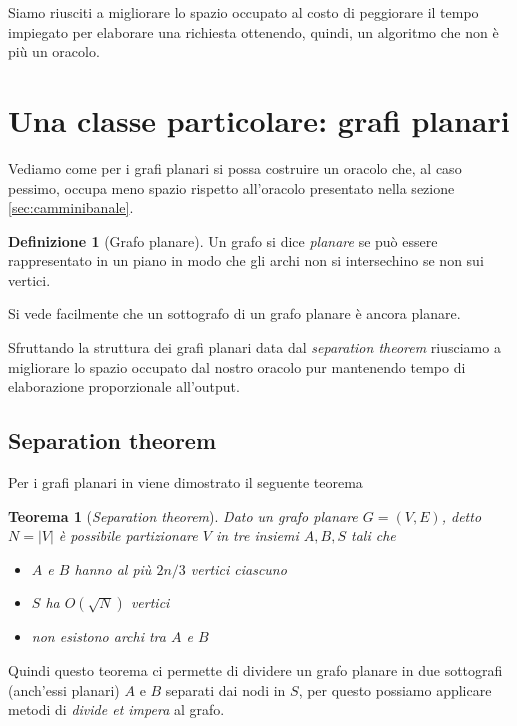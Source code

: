 \documentclass[a4paper,10pt]{amsbook}
\newcounter{counter1}
\theoremstyle{plain}
\newtheorem{myteo}[counter1]{Teorema}
\theoremstyle{definition}
\newtheorem{mydef}[counter1]{Definizione}
\theoremstyle{remark}
\newcommand{\pa}[1]{\left(#1\right)}
\newcommand{\abs}[1]{\left|#1\right|}
\begin{document}
Siamo riusciti a migliorare lo spazio occupato al costo di peggiorare
il tempo impiegato per elaborare una richiesta ottenendo, quindi, un
algoritmo che non \`e pi\`u un oracolo.

\section{Una classe particolare: grafi planari}

Vediamo come per i grafi planari si possa costruire un oracolo che, al
caso pessimo, occupa meno spazio rispetto all'oracolo presentato nella
sezione \ref{sec:camminibanale}.

\begin{mydef}[Grafo planare]
  Un grafo si dice \textit{planare} se pu\`o essere rappresentato in
  un piano in modo che gli archi non si intersechino se non sui
  vertici.
\end{mydef}

Si vede facilmente che un sottografo di un grafo planare \`e ancora
planare. 

Sfruttando la struttura dei grafi planari data dal \textit{separation
  theorem} riusciamo a migliorare lo spazio occupato dal nostro
oracolo pur mantenendo tempo di elaborazione proporzionale all'output.

\subsection{Separation theorem}

Per i grafi planari in \cite{separator} viene dimostrato il seguente
teorema
\begin{myteo}[\textit{Separation theorem}]
  Dato un grafo planare $G = (V,E)$, detto $N = \abs{V}$ \`e
  possibile partizionare $V$ in tre insiemi $A,B,S$ tali che
  \begin{itemize}
  \item $A$ e $B$ hanno al pi\`u $2n/3$ vertici ciascuno
  \item $S$ ha $O\pa{ \sqrt{N}}$ vertici
  \item non esistono archi tra $A$ e $B$
  \end{itemize}
\end{myteo}

Quindi questo teorema ci permette di dividere un grafo planare in due
sottografi (anch'essi planari) $A$ e $B$ separati dai nodi in $S$, per
questo possiamo applicare metodi di \textit{divide et impera} al
grafo.
\end{document}
